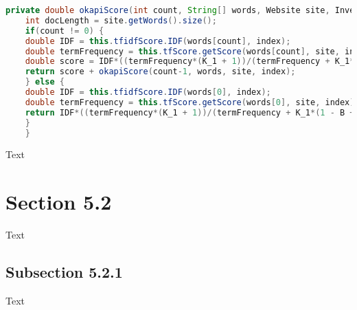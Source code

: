 \begin{lstlisting}[language=Java]
    private double okapiScore(int count, String[] words, Website site, InvertedIndex index) {
    int docLength = site.getWords().size();
    if(count != 0) {
    double IDF = this.tfidfScore.IDF(words[count], index);
    double termFrequency = this.tfScore.getScore(words[count], site, index);
    double score = IDF*((termFrequency*(K_1 + 1))/(termFrequency + K_1*(1 - B + B*(docLength/AVERAGE_DOC_LENGTH))));
    return score + okapiScore(count-1, words, site, index);
    } else {
    double IDF = this.tfidfScore.IDF(words[0], index);
    double termFrequency = this.tfScore.getScore(words[0], site, index);
    return IDF*((termFrequency*(K_1 + 1))/(termFrequency + K_1*(1 - B + B*(docLength/AVERAGE_DOC_LENGTH))));
    }
    }
\end{lstlisting}
Text \\




\section{Section 5.2}
Text\\




\subsection{Subsection 5.2.1}
Text\\
